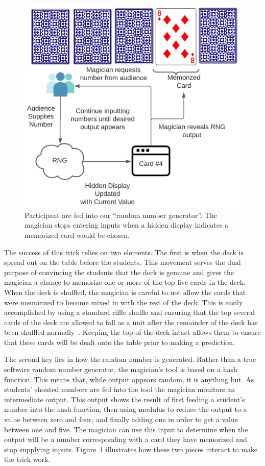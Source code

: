 \begin{figure}[H]
\centering
\includegraphics[scale=.6]{images/Trick3}
\caption{Participant are fed into our ``random number generator''.  The magician stops entering inputs
when a hidden display indicates a memorized card would be chosen.}
\label{fig:trick3}
\end{figure}

The success of this trick relies on two elements.
The first is when the deck is spread out on the
table before the students.  This movement serves the dual purpose of convincing
the students that the deck is genuine and gives the magician a chance to
memorize one or more of the top five cards in the deck.
When the deck is
shuffled, the magician is careful to not allow the cards that were memorized to
become mixed in with the rest of the deck.  This is easily accomplished by
using a standard riffle shuffle and ensuring that the top several cards of
the deck are allowed to fall as a unit after the remainder of the deck has
been shuffled normally~\cite{wikishuffle}.
Keeping the top of the deck intact allows them to ensure that
these cards will be dealt onto the table prior to making a prediction.


The second key lies in how the random number is generated.
Rather than
a true software random number generator, the magician's tool is based on a hash
function.  This means that, while output appears random, it is anything but.
As students' shouted numbers are fed into the tool the magician monitors an
intermediate output.
This output shows the result of first feeding a student's number
into the hash function, then using modulus to reduce the output to a value
between zero and four, and finally adding one in order to get a value between
one and five.
The magician can use this input to determine when the output will be a number
corresponding with a card they have memorized and stop supplying inputs.
Figure~\ref{fig:trick3} illustrates how these two pieces interact to make
the trick work.


